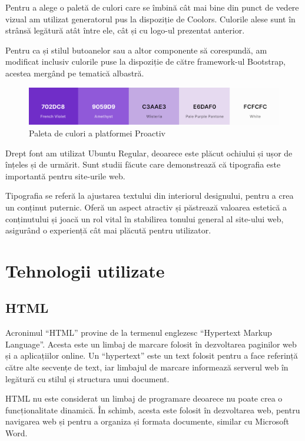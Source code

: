 \documentclass[12pt,a4paper]{report}
\begin{document}
\par
Pentru a alege o paletă de culori care se îmbină cât mai bine din punct de vedere vizual am utilizat generatorul pus la dispoziție de Coolors\cite{coolors}. Culorile alese sunt în strânsă legătură atât între ele, cât și cu logo-ul prezentat anterior.
\\\par 
Pentru ca și stilul butoanelor sau a altor componente să corespundă, am modificat inclusiv culorile puse la dispoziție de către framework-ul Bootstrap, acestea mergând pe tematică albastră.
\\
\begin{figure}[H]
\centering
  \includegraphics[width=1\linewidth]{./imagini/coolors.PNG}
  \caption{Paleta de culori a platformei Proactiv}
\end{figure}

\par
Drept font am utilizat Ubuntu Regular, deoarece este plăcut ochiului și ușor de înțeles și de urmărit. Sunt studii făcute care demonstrează că tipografia este importantă pentru site-urile web. 
\\\par 
Tipografia se referă la ajustarea textului din interiorul designului, pentru a crea un conținut puternic. Oferă un aspect atractiv și păstrează valoarea estetică a conținutului și joacă un rol vital în stabilirea tonului general al site-ului web, asigurând o experiență cât mai plăcută pentru utilizator.

\newpage
\section{Tehnologii utilizate}
\subsection{HTML}
\par
Acronimul “HTML” provine de la termenul englezesc “Hypertext Markup Language”. Acesta este un limbaj de marcare folosit în dezvoltarea paginilor web și a aplicațiilor online. Un “hypertext” este un text folosit pentru a face referință către alte secvențe de text, iar limbajul de marcare informează serverul web în legătură cu stilul și structura unui document.
\\\par 
HTML nu este considerat un limbaj de programare deoarece nu poate crea o funcționalitate dinamică. În schimb, acesta este folosit în dezvoltarea web, pentru navigarea web și pentru a organiza și formata documente, similar cu Microsoft Word.
\end{document}
